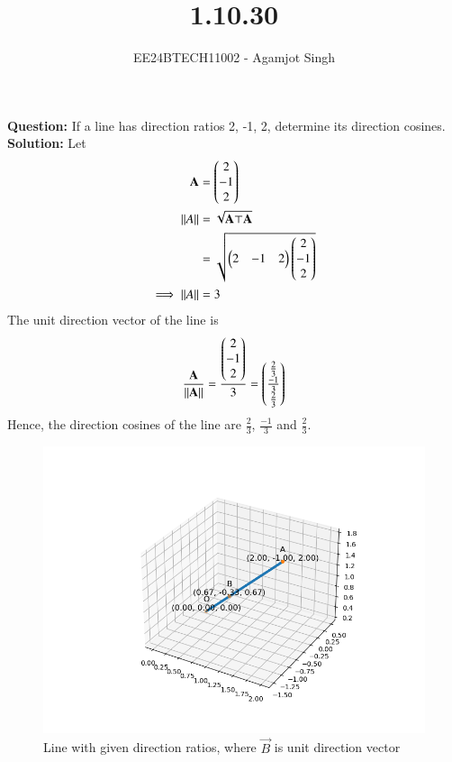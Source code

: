 \documentclass[journal]{IEEEtran}
\begin{document}

\vspace{3cm}

\title{1.10.30}
\author{EE24BTECH11002 - Agamjot Singh
}
{\let\newpage\relax\maketitle}

\renewcommand{\thefigure}{\theenumi}
\renewcommand{\thetable}{\theenumi}
\setlength{\intextsep}{10pt} %

\textbf{Question:}
\newline
If a line has direction ratios 2, -1, 2, determine its direction cosines.
\newline
\textbf{Solution:}
\newline
Let 
\begin{align}
	\mathbf{A} &= \begin{pmatrix}2\\-1\\2\end{pmatrix}\\
	\left\lVert A\right\rVert &= \sqrt{\mathbf{A}\top\mathbf{A}}\\
		     &= \sqrt{\begin{pmatrix}2 & -1 & 2\end{pmatrix}\begin{pmatrix}2\\-1\\2\end{pmatrix}}\\
	\implies \left\lVert A\right\rVert &= 3
\end{align}
The unit direction vector of the line is
\begin{align}
	\frac{\mathbf{A}}{\left\lVert\mathbf{A}\right\rVert} = \frac{\begin{pmatrix}2\\-1\\2\end{pmatrix}}{3} = \begin{pmatrix}\frac{2}{3}\\\frac{-1}{3}\\\frac{2}{3}\end{pmatrix}
\end{align}
Hence, the direction cosines of the line are $\frac{2}{3}$, $\frac{-1}{3}$ and $\frac{2}{3}$.

\begin{figure}[h!]
   \centering
   \includegraphics[width=0.7\linewidth]{figs/graph.png}
   \caption{Line with given direction ratios, where $\vec{B}$ is unit direction vector}
\end{figure}
\end{document}
